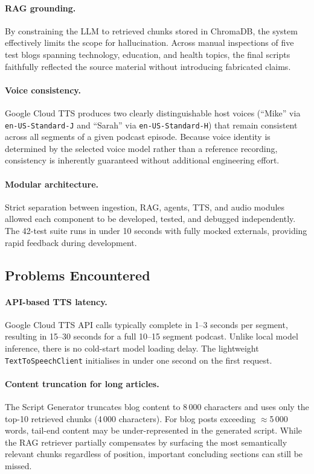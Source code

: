 \documentclass[sigconf,natbib=false]{acmart}   %
\begin{document}
\paragraph{RAG grounding.}
By constraining the LLM to retrieved chunks stored in ChromaDB, the system effectively limits the scope for hallucination.  Across manual inspections of five test blogs spanning technology, education, and health topics, the final scripts faithfully reflected the source material without introducing fabricated claims.

\paragraph{Voice consistency.}
Google Cloud TTS produces two clearly distinguishable host voices (``Mike'' via \texttt{en-US-Standard-J} and ``Sarah'' via \texttt{en-US-Standard-H}) that remain consistent across all segments of a given podcast episode.  Because voice identity is determined by the selected voice model rather than a reference recording, consistency is inherently guaranteed without additional engineering effort.

\paragraph{Modular architecture.}
Strict separation between ingestion, RAG, agents, TTS, and audio modules allowed each component to be developed, tested, and debugged independently.  The 42-test suite runs in under 10 seconds with fully mocked externals, providing rapid feedback during development.

\subsection{Problems Encountered}

\paragraph{API-based TTS latency.}
Google Cloud TTS API calls typically complete in 1--3 seconds per segment, resulting in 15--30 seconds for a full 10--15 segment podcast.  Unlike local model inference, there is no cold-start model loading delay.  The lightweight \texttt{TextToSpeechClient} initialises in under one second on the first request.

\paragraph{Content truncation for long articles.}
The Script Generator truncates blog content to 8\,000 characters and uses only the top-10 retrieved chunks (4\,000 characters).  For blog posts exceeding $\approx$5\,000 words, tail-end content may be under-represented in the generated script.  While the RAG retriever partially compensates by surfacing the most semantically relevant chunks regardless of position, important concluding sections can still be missed.
\end{document}
